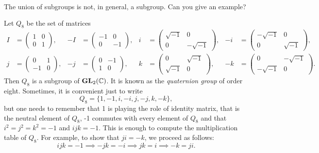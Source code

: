 \begin{exercise}
\label{xca:union}
        The union of subgroups is not, in general, 
        a subgroup. Can you give an example? 
\end{exercise}

\begin{example}
    Let $Q_8$ be the set of matrices 
    \begin{align*}
        I&=\begin{pmatrix}
            1&0\\
            0&1
        \end{pmatrix},
        &
        -I&=\begin{pmatrix}
            -1&0\\
            0&-1
        \end{pmatrix},
        &
        i&=\begin{pmatrix}
            \sqrt{-1}&0\\
            0&-\sqrt{-1}
        \end{pmatrix},
        &
        -i&=\begin{pmatrix}
            -\sqrt{-1}&0\\
            0&\sqrt{-1}
        \end{pmatrix},\\
        j&=\begin{pmatrix}
            0&1\\
            -1&0
        \end{pmatrix},
        &
        -j&=\begin{pmatrix}
            0&-1\\
            1&0
        \end{pmatrix},
        &
        k&=\begin{pmatrix}
            0&\sqrt{-1}\\
            \sqrt{-1}&0
        \end{pmatrix},
        &
        -k &=\begin{pmatrix}
            0&-\sqrt{-1}\\
            -\sqrt{-1}&0
        \end{pmatrix}.
    \end{align*}
    Then $Q_8$ is a subgroup of $\mathbf{GL}_2(\mathbb{C})$. It is known as the \emph{quaternion group} of order eight. Sometimes, it is convenient just to write
    \[
    Q_8=\{1,-1,i,-i,j,-j,k,-k\}, 
    \]
    but one needs to remember 
    that 1 is playing the role of identity matrix, that is the neutral element of $Q_8$, 
    -1 commutes with every element of $Q_8$ 
    and that $i^2=j^2=k^2=-1$ and $ijk=-1$. This is enough to compute the multiplication table
    of $Q_8$. For example, to show that $ji=-k$, we proceed as follows: 
    \[
    ijk=-1\implies -jk=-i\implies jk=i\implies -k=ji.
    \]
\end{example}

